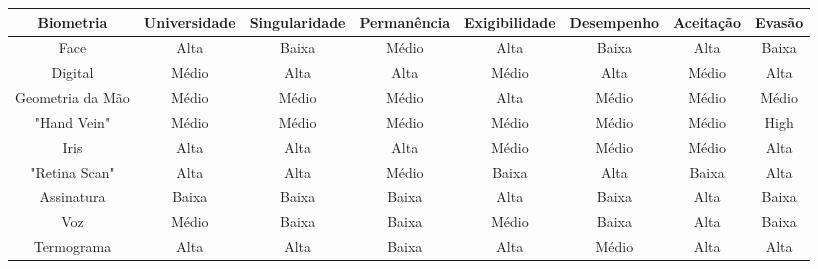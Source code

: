 	\begin{center}
	\begin{tabular}{|c|c|c|c|c|c|c|c|}
		\hline Biometria & Universidade & Singularidade & Permanência & Exigibilidade & Desempenho & Aceitação & Evasão \\
		\hline Face & Alta & Baixa & Médio & Alta & Baixa & Alta & Baixa\\
		\hline Digital & Médio & Alta & Alta & Médio & Alta & Médio &  Alta\\
		\hline Geometria da Mão & Médio & Médio & Médio & Alta & Médio & Médio & Médio\\
		\hline "Hand Vein" & Médio & Médio & Médio & Médio & Médio & Médio & High\\
		\hline Iris & Alta & Alta & Alta & Médio & Médio & Médio & Alta\\
		\hline "Retina Scan" & Alta & Alta & Médio & Baixa & Alta & Baixa & Alta\\
		\hline Assinatura & Baixa & Baixa & Baixa & Alta & Baixa & Alta & Baixa \\
		\hline Voz & Médio & Baixa & Baixa & Médio & Baixa & Alta & Baixa \\
		\hline Termograma & Alta & Alta & Baixa & Alta & Médio & Alta & Alta \\
		\hline
	\end{tabular}
	\end{center}












































